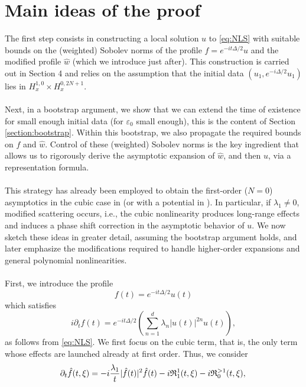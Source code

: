 \documentclass[a4paper, 15pt]{article}
\numberwithin{equation}{section}
\begin{document}
\section{Main ideas of the proof}
The first step consists in constructing a local solution $u$ to \eqref{eq:NLS} with suitable bounds on the (weighted) Sobolev norms of the profile $f=e^{-it\Delta/2}u$ and the modified profile $\hat{w}$ (which we introduce just after). This construction is carried out in Section 4 and relies on the assumption that the initial data $(u_1,e^{-i\Delta/2}u_1)$ lies in $H^{1,0}_x\times H^{0,2N+1}_x$.\\\\
Next, in a bootstrap argument, we show that we can extend the time of existence for small enough initial data (for $\varepsilon_0$ small enough), this is the content of Section \ref{section:bootstrap}. Within this bootstrap, we also propagate the required bounds on $f$ and $\hat{w}$. Control of these (weighted) Sobolev norms is the key ingredient that allows us to rigorously derive the asymptotic expansion of $\hat{w}$, and then $u$, via a representation formula.\\\\
This strategy has already been employed to obtain the first-order ($N=0$) asymptotics in the cubic case in \cite{zbMATH06033880} (or with a potential in \cite{zbMATH06931169}). In particular, if $\lambda_1\neq0$, modified scattering occurs, i.e., the cubic nonlinearity produces long-range effects and induces a phase shift correction in the asymptotic behavior of $u$. We now sketch these ideas in greater detail, assuming the bootstrap argument holds, and later emphasize the modifications required to handle higher-order expansions and general polynomial nonlinearities.\\\\
First, we introduce the profile 
\begin{equation}
\label{eq:profile}
    f(t)=e^{-it\Delta/2}u(t)
\end{equation}
which satisfies 
\begin{equation}
\label{eq:NLSf}
    i\partial_tf(t)=e^{-it\Delta/2}(\sum_{n=1}^{d}\lambda_n|u(t)|^{2n}u(t)),
\end{equation}
as follows from \eqref{eq:NLS}. We first focus on the cubic term, that is, the only term whose effects are launched already at first order. Thus, we consider
\begin{equation}
\label{eq:showfirstorder}
    \partial_t\hat{f}(t,\xi)=-i\frac{\lambda_1}{t}|\hat{f}(t)|^2\hat{f}(t)-i\mathfrak{R}^1_1(t,\xi)-i\mathfrak{R}^{>1}_0(t,\xi),\\
\end{equation}
\end{document}
